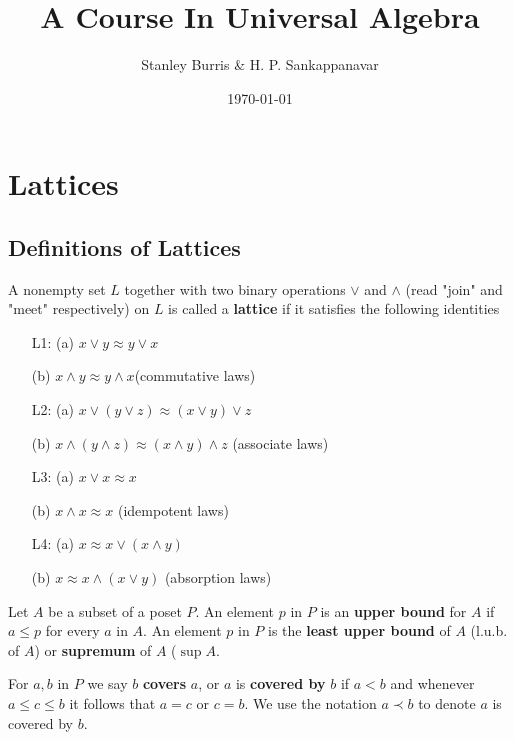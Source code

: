 \documentclass[11pt]{article}
\author{Stanley Burris \& H. P. Sankappanavar}
\date{\today}
\title{A Course In Universal Algebra}
\begin{document}
\maketitle \clearpage
\tableofcontents \clearpage
\section{Lattices}
\label{sec:org3a5e393}

\subsection{Definitions of Lattices}
\label{sec:org54ae7ae}
\begin{definition}[]
A nonempty set \(L\) together with two binary operations \(\vee\) and \(\wedge\)
(read "join" and "meet" respectively) on \(L\) is called a \textbf{lattice} if it
satisfies the following identities
\begin{itemize}%
 \item[L1:] (a) $x\vee y\approx y\vee x$ \par
 (b) $x\wedge y\approx y\wedge x$\hspace*{\fill}(commutative laws)
 \item[L2:] (a) $x\vee(y\vee z)\approx(x\vee y)\vee z$ \par 
 (b) $x\wedge(y\wedge z)\approx(x\wedge y)\wedge z$
 \hspace*{\fill}(associate laws)
 \item[L3:] (a) \(x\vee x\approx x\)\par 
 (b) \(x\wedge x\approx x\)
 \hspace*{\fill}(idempotent laws)
 \item[L4:] (a) \(x\approx x\vee(x\wedge y)\)\par 
 (b) \(x\approx x\wedge(x\vee y)\)
 \hspace*{\fill}(absorption laws)
\end{itemize}
\end{definition}

\begin{definition}[]
Let \(A\) be a subset of a poset \(P\). An element \(p\) in \(P\) is an \textbf{upper bound}
for \(A\) if \(a\le p\) for every \(a\) in \(A\). An element \(p\) in \(P\) is the
\textbf{least upper bound} of \(A\) (l.u.b. of \(A\)) or \textbf{supremum} of \(A\) (\(\sup A\).

For \(a,b\) in \(P\) we say \(b\) \textbf{covers} \(a\), or \(a\) is \textbf{covered by} \(b\) if
\(a<b\) and whenever \(a\le c\le b\) it follows that \(a=c\) or \(c=b\). We
use the notation \(a\prec b\) to denote \(a\) is covered by \(b\). 
\end{definition}
\end{document}

